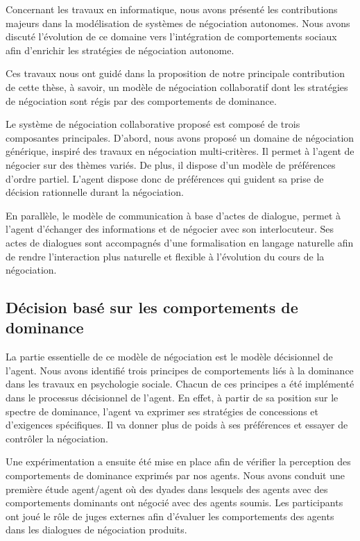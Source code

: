 	Concernant les travaux en informatique, nous avons présenté les contributions majeurs dans la modélisation de systèmes de négociation autonomes. Nous avons discuté l'évolution de ce domaine vers l'intégration de comportements sociaux afin d'enrichir les stratégies de négociation autonome. 
	
	
	Ces travaux nous ont guidé dans la proposition de notre principale contribution de cette thèse, à savoir, un modèle de négociation collaboratif dont les stratégies de négociation sont régis par des comportements de dominance.
	
	Le système de négociation collaborative proposé est composé de trois composantes principales.
	D'abord, nous avons proposé un domaine de négociation générique, inspiré des travaux en négociation multi-critères. Il permet à l'agent de négocier sur des thèmes variés. De plus, il dispose d'un modèle de préférences d'ordre partiel. L'agent dispose donc de préférences qui guident sa prise de décision rationnelle durant la négociation.
	
	En parallèle, le modèle de communication à base d'actes de dialogue, permet à l'agent d'échanger des informations et de négocier avec son interlocuteur. Ses actes de dialogues sont accompagnés d'une formalisation en langage naturelle afin de rendre l'interaction plus naturelle et flexible à l'évolution du cours de la négociation.
	
	\subsection{Décision basé sur les comportements de dominance}
	 
	 La partie essentielle de ce modèle de négociation est le modèle décisionnel de l'agent. Nous avons identifié trois principes de comportements liés à la dominance dans les travaux  en psychologie sociale. Chacun de ces principes a été implémenté dans le processus décisionnel de l'agent.
	 En effet, à partir de sa position sur le spectre de dominance, l'agent va exprimer ses stratégies de concessions et d'exigences spécifiques. Il va donner plus de poids à ses préférences et essayer de contrôler la négociation. 
	
	Une expérimentation a ensuite été mise en place afin de vérifier la perception des comportements de dominance exprimés par nos agents.
	Nous avons conduit une première étude agent/agent où des dyades dans lesquels des agents avec des comportements dominants ont négocié avec des agents soumis. Les participants ont joué le rôle de juges externes afin d'évaluer les comportements des agents dans les dialogues de négociation produits. 

